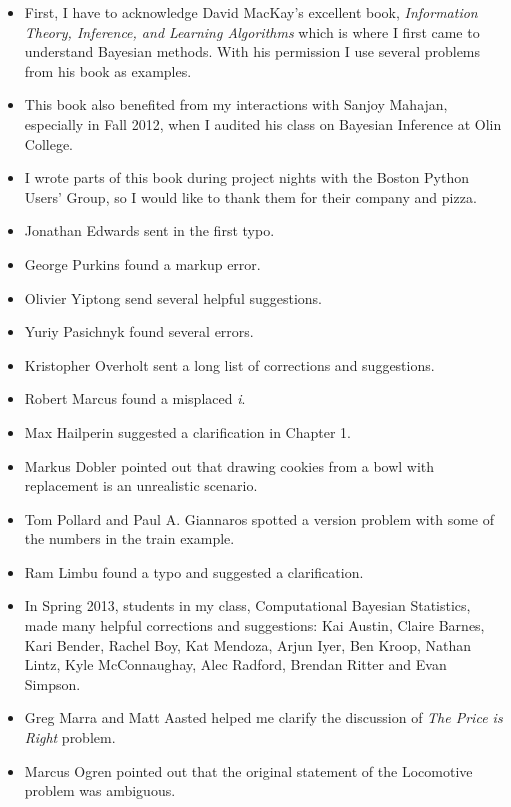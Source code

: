 \documentclass[12pt]{book}
\begin{document}
\begin{itemize}

\item First, I have to acknowledge David MacKay's excellent book,
  {\it Information Theory, Inference, and Learning Algorithms} which is
  where I first came to understand Bayesian methods.  With his
  permission I use several problems from
  his book as examples.

\item This book also benefited from my interactions with Sanjoy
  Mahajan, especially in Fall 2012, when I audited his class on
  Bayesian Inference at Olin College.

\item I wrote parts of this book during project nights with the Boston
  Python Users' Group, so I would like to thank them for their
  company and pizza.

\item Jonathan Edwards sent in the first typo.

\item George Purkins found a markup error.

\item Olivier Yiptong send several helpful suggestions.

\item Yuriy Pasichnyk found several errors.

\item Kristopher Overholt sent a long list of corrections and suggestions.

\item Robert Marcus found a misplaced {\it i}.

\item Max Hailperin suggested a clarification in Chapter 1.

\item Markus Dobler pointed out that drawing cookies from a bowl
with replacement is an unrealistic scenario.

\item Tom Pollard and Paul A. Giannaros spotted a version problem with
  some of the numbers in the train example.

\item Ram Limbu found a typo and suggested a clarification.

\item In Spring 2013, students in my class, Computational Bayesian
  Statistics, made many helpful corrections and suggestions: Kai
  Austin, Claire Barnes, Kari Bender, Rachel Boy, Kat Mendoza, Arjun
  Iyer, Ben Kroop, Nathan Lintz, Kyle McConnaughay, Alec Radford,
  Brendan Ritter and Evan Simpson.

\item Greg Marra and Matt Aasted helped me clarify the discussion of
  {\it The Price is Right} problem.

\item Marcus Ogren pointed out that the original statement of the
  Locomotive problem was ambiguous.


\end{itemize}
\end{document}
